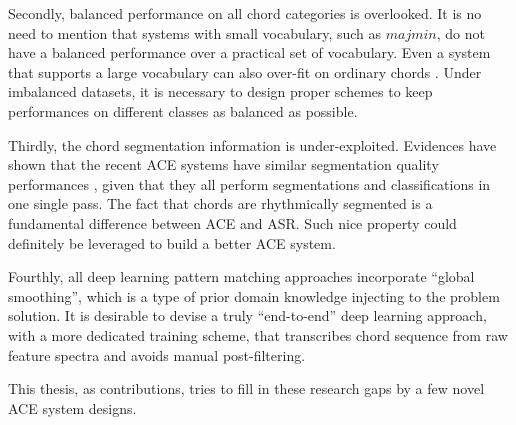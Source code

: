 Secondly, balanced performance on all chord categories is overlooked. It is no need to mention that systems with small vocabulary, such as $majmin$, do not have a balanced performance over a practical set of vocabulary. Even a system that supports a large vocabulary can also over-fit on ordinary chords \cite{deng2016hybrid}. Under imbalanced datasets, it is necessary to design proper schemes to keep performances on different classes as balanced as possible.

Thirdly, the chord segmentation information is under-exploited. Evidences have shown that the recent ACE systems have similar segmentation quality performances \cite{burgoyne2014comparative}, given that they all perform segmentations and classifications in one single pass. The fact that chords are rhythmically segmented is a fundamental difference between ACE and ASR. Such nice property could definitely be leveraged to build a better ACE system.

Fourthly, all deep learning pattern matching approaches incorporate ``global smoothing'', which is a type of prior domain knowledge injecting to the problem solution. It is desirable to devise a truly ``end-to-end'' deep learning approach, with a more dedicated training scheme, that transcribes chord sequence from raw feature spectra and avoids manual post-filtering.

This thesis, as contributions, tries to fill in these research gaps by a few novel ACE system designs.

